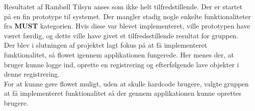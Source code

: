 Resultatet af Rambøll Tilsyn anses som ikke helt tilfredstillende. 
Der er startet på en fin prototype til systemet. Der mangler stadig nogle enkelte funktionaliteter fra \textbf{MUST} kategorien. Hvis disse var blevet implementeret, ville prototypen have været færdig, og dette ville have givet et tilfredsstillende resultat for gruppen. \\
Der blev i slutningen af projektet lagt fokus på at få implementeret funktionalitet, så flowet igennem applikationen fungerede. Her menes der, at bruger kunne logge ind, oprette en registrering og efterfølgende lave objekter i denne registrering. \\
For at kunne gøre flowet muligt, uden at skulle hardcode brugere, valgte gruppen at få implementeret funktionalitet så der gennem applikationen kunne oprettes brugere.